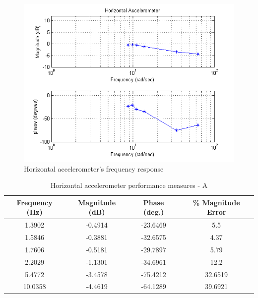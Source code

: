 \documentclass{article}
\theoremstyle{plain}
\theoremstyle{definition}
\theoremstyle{remark}
\begin{document}
\begin{figure}[hbt]
\begin{center}
\includegraphics[width = 14cm]{HorizontalBode.png}
\caption{Horizontal accelerometer's frequency response}
\label{horizontalBode}
\end{center}
\end{figure}

\begin{table}
\begin{center}
    \begin{tabular}{|c|c|c|c|}
        \hline
        Frequency (Hz)  & Magnitude (dB) & Phase (deg.) & \% Magnitude Error \\ \hline
	1.3902  & -0.4914  & -23.6469 & 5.5\\
       1.5846  & -0.3881  & -32.6575 & 4.37 \\
	1.7606  & -0.5181  & -29.7897  & 5.79  \\
	2.2029 &  -1.1301 & -34.6961 &  12.2  \\
	5.4772 & -3.4578  & -75.4212 & 32.6519  \\
	10.0358 & -4.4619 & -64.1289 & 39.6921 \\
        \hline
    \end{tabular}
\caption{Horizontal accelerometer performance measures - A}  
\label{horizontal_tableA}
\end{center}
\end{table}
\end{document}
